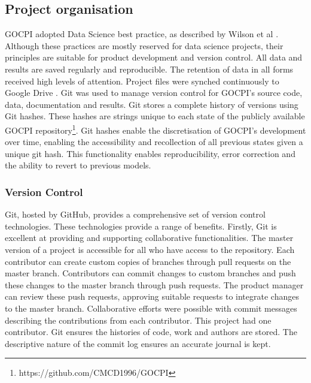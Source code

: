 \documentclass[12pt]{article}
\begin{document}
\subsection{Project organisation}
GOCPI adopted Data Science best practice, as described by Wilson et al \cite{J:10}. Although these practices are
mostly reserved for data science projects, their principles are suitable for product development and version control. All data and
results are saved regularly and reproducible. The retention of data in all forms received high levels of attention. Project files were synched
continuously to Google Drive \cite{Google_Drive}. Git \cite{Git} was used to manage version control for GOCPI's source code, data, documentation and results.
Git stores a complete history of versions using Git hashes. These hashes are strings unique to each state of the
publicly available GOCPI repository\footnote[1]{https://github.com/CMCD1996/GOCPI}. Git hashes enable the discretisation of GOCPI's development over time,
enabling the accessibility and recollection of all previous states given a unique git hash. This functionality
enables reproducibility, error correction and the ability to revert to previous models.

\subsubsection{Version Control}\label{Version Control}
Git, hosted by GitHub, provides a comprehensive set of version control technologies. These technologies provide a range of benefits.
Firstly, Git is excellent at providing and supporting collaborative functionalities. The master version of a project is accessible for all
who have access to the repository. Each contributor can create custom copies of branches through pull requests on the master branch. Contributors
can commit changes to custom branches and push these changes to the master branch through push requests. The product manager can review these push requests,
approving suitable requests to integrate changes to the master branch. Collaborative efforts were possible with
commit messages describing the contributions from each contributor. This project had one contributor. Git ensures the histories of code, work and authors are stored.
The descriptive nature of the commit log ensures an accurate journal is kept.
\end{document}
